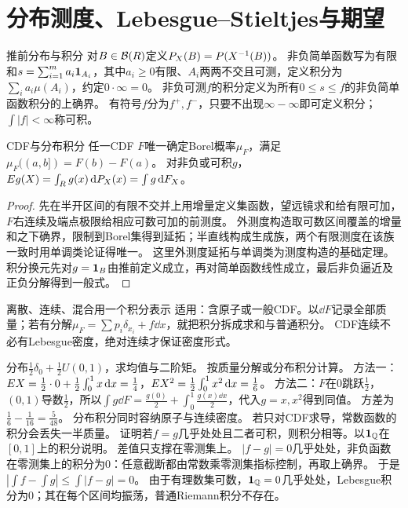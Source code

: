 \section{分布测度、Lebesgue--Stieltjes与期望}\label{sec:102}
\begin{definition}{推前分布与积分}
对$B\in\mathcal B(R)$定义$P_X(B)=P(X^{-1}(B))$。
非负简单函数写为有限和$s=\sum_{i=1}^m a_i\mathbf1_{A_i}$，其中$a_i\ge0$有限、$A_i$两两不交且可测，定义积分为$\sum_i a_i\mu(A_i)$，约定$0\cdot\infty=0$。
非负可测$f$的积分定义为所有$0\le s\le f$的非负简单函数积分的上确界。
有符号$f$分为$f^+,f^-$，只要不出现$\infty-\infty$即可定义积分；$\int|f|<\infty$称可积。
\end{definition}
\begin{theorem}{CDF与分布积分}
任一CDF $F$唯一确定Borel概率$\mu_F$，满足$\mu_F((a,b])=F(b)-F(a)$。
对非负或可积$g$，$E g(X)=\int_R g(x)\,\mathrm dP_X(x)=\int g\,\mathrm d F_X$。
\end{theorem}
\begin{proof}
先在半开区间的有限不交并上用增量定义集函数，望远镜求和给有限可加，$F$右连续及端点极限给相应可数可加的前测度。
外测度构造取可数区间覆盖的增量和之下确界，限制到Borel集得到延拓；半直线构成生成族，两个有限测度在该族一致时用单调类论证得唯一。
这里外测度延拓与单调类为测度构造的基础定理。
积分换元先对$g=\mathbf1_B$由推前定义成立，再对简单函数线性成立，最后非负逼近及正负分解得到一般式。
\end{proof}
\begin{method}{离散、连续、混合用一个积分表示}
适用：含原子或一般CDF。以$\dd F$记录全部质量；若有分解$\mu_F=\sum p_i\delta_{x_i}+f\dd x$，就把积分拆成求和与普通积分。
CDF连续不必有Lebesgue密度，绝对连续才保证密度形式。
\end{method}
{分布$\frac12\delta_0+\frac12U(0,1)$，求均值与二阶矩。}
{按质量分解或分布积分计算。}
{方法一：$E X=\frac12\cdot0+\frac12\int_0^1x\,\mathrm d x=\frac{1}{4}$，$E X^2=\frac12\int_0^1x^2\,\mathrm d x=\frac{1}{6}$。
方法二：$F$在0跳跃$\frac{1}{2}$，$(0,1)$导数$\frac{1}{2}$，所以$\int g\dd F=\frac{g(0)}{2}+\int_0^1\frac{g(x)\dd x}{2}$，代入$g=x,x^2$得到同值。
方差为$\frac{1}{6}-\frac{1}{16}=\frac{5}{48}$。}
{分布积分同时容纳原子与连续密度。}
{若只对CDF求导，常数函数的积分会丢失一半质量。}
{证明若$f=g$几乎处处且二者可积，则积分相等。以$\mathbf1_{\mathbb Q}$在$[0,1]$上的积分说明。}
{差值只支撑在零测集上。}
{$|f-g|=0$几乎处处，非负函数在零测集上的积分为0：任意截断都由常数乘零测集指标控制，再取上确界。
于是$|\int f-\int g|\le\int|f-g|=0$。
由于有理数集可数，$\mathbf1_{\mathbb Q}=0$几乎处处，Lebesgue积分为0；其在每个区间均振荡，普通Riemann积分不存在。}
